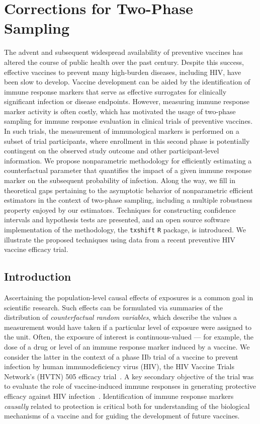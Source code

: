 \chapter{Corrections for Two-Phase Sampling}

The advent and subsequent widespread availability of preventive vaccines has
altered the course of public health over the past century. Despite this success,
effective vaccines to prevent many high-burden diseases, including HIV, have
been slow to develop. Vaccine development can be aided by the identification of
immune response markers that serve as effective surrogates for clinically
significant infection or disease endpoints. However, measuring immune response
marker activity is often costly, which has motivated the usage of two-phase
sampling for immune response evaluation in clinical trials of preventive
vaccines. In such trials, the measurement of immunological markers is performed
on a subset of trial participants, where enrollment in this second phase is
potentially contingent on the observed study outcome and other participant-level
information. We propose nonparametric methodology for efficiently estimating
a counterfactual parameter that quantifies the impact of a given immune response
marker on the subsequent probability of infection. Along the way, we fill in
theoretical gaps pertaining to the asymptotic behavior of nonparametric
efficient estimators in the context of two-phase sampling, including a multiple
robustness property enjoyed by our estimators. Techniques for constructing
confidence intervals and hypothesis tests are presented, and an open source
software implementation of the methodology, the \texttt{txshift} \texttt{R}
package, is introduced. We illustrate the proposed techniques using data from
a recent preventive HIV vaccine efficacy trial.

\section{Introduction}\label{intro}

Ascertaining the population-level causal effects of exposures is a common goal
in scientific research. Such effects can be formulated via summaries of the
distribution of \emph{counterfactual random variables}, which describe the
values a measurement would have taken if a particular level of exposure were
assigned to the unit. Often, the exposure of interest is continuous-valued ---
for example, the dose of a drug or level of an immune response marker induced by
a vaccine. We consider the latter in the context of a phase IIb trial of
a vaccine to prevent infection by human immunodeficiency virus (HIV), the HIV
Vaccine Trials Network's (HVTN) 505 efficacy trial~\citep{hammer2013efficacy}.
A key secondary objective of the trial was to evaluate the role of
vaccine-induced immune responses in generating protective efficacy against HIV
infection~\citep{janes2017higher}. Identification of immune response markers
\textit{causally} related to protection is critical both for understanding of
the biological mechanisms of a vaccine and for guiding the development of future
vaccines.

